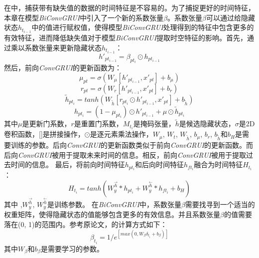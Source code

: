在\cite{14}中，捕获带有缺失值的数据的时间特征是不容易的。为了捕捉更好的时间特征，本章在模型\textit{BiConvGRUI}中引入了一个新的系数张量$\beta$。系数张量$\beta$可以通过给隐藏状态$h_{t_{i-1}}$中的值进行赋权值，使得模型\textit{BiConvGRUI}处理得到的特征中包含更多的有效特征，进而降低缺失值对于模型\textit{BiConvGRUI}提取时空特征的影响。首先，通过乘以系数张量来更新隐藏状态$h_{t_{i-1}}$：    
\begin{equation}
h'_{pt_{i-1}}={\beta}_{pt_i}\odot h_{pt_{i-1}}
\end{equation}
然后，前向\textit{ConvGRUI}的更新函数为：
\begin{equation}
{\mu}_{pt}={\sigma}(W_{\mu}[h'_{pt_{i-1}},x'_{pt}]+b_{\mu})
\end{equation}
\begin{equation}
r_{pt}={\sigma}(W_r[h'_{pt_{i-1}},x'_{pt}]+b_r)
\end{equation}
\begin{equation}
\tilde{h}_{pt_i}=tanh(W_{\tilde{h}}[r_{pt_i}\odot h'_{pt_{i-1}},x'_{pt}]+b_{\tilde{h}})
\end{equation}
\begin{equation}
{h}_{pt_i}=(1-{\mu}_{pt_i})\odot h'_{pt_{i-1}}+{\mu}\odot \tilde{h}_{pt_i}
\end{equation}
其中$\mu$是更新门系数，$r$是重置门系数，$M_{t_i}$是掩码张量，$\tilde{h}$是候选隐藏状态，$\sigma$是2D卷积函数，[]是拼接操作，$\odot$是逐元素乘法操作，$W_{\mu}$, $W_t$, $W_{\tilde{h}}$, $b_{\mu}$, $b_r$, $b_{\tilde{h}}$和$b_H$是需要训练的参数。后向\textit{ConvGRUI}的更新函数类似于前向\textit{ConvGRUI}的更新函数。而后向\textit{ConvGRUI}被用于提取未来时间的信息。相反，前向\textit{ConvGRUI}被用于提取过去时间的信息。
最后，将前向时间特征$h_{pt_i}$和后向时间特征$h_{ft_i}$融合为时间特征$H_{t_i}$：
\begin{equation}
H_{t_i}=tanh(W_y^{\overset{\rightarrow}{h}}*h_{pt_i}+W_y^{\overset{\leftarrow}{h}}*h_{ft_i}+b_H) 
\end{equation}
其中 ,$W_y^{\overset{\rightarrow}{h}}$, $W_y^{\overset{\leftarrow}{h}}$是训练参数。
在\textit{BiConvGRUI}中，系数张量$\beta$需要找寻到一个适当的权重矩阵，使得隐藏状态的值能够包含更多的有效信息。并且系数张量$\beta$的值需要落在(0, 1)的范围内。参考原论文\cite{14}，的计算方式如下：
\begin{equation}
{\beta}_{t_i}=1/e^{[max(0,W_{{\beta}}{\delta}_{t_i}+b_{{\beta}})]}
\end{equation}
其中$W_{{\beta}}$和$b_{{\beta}}$是需要学习的参数。

